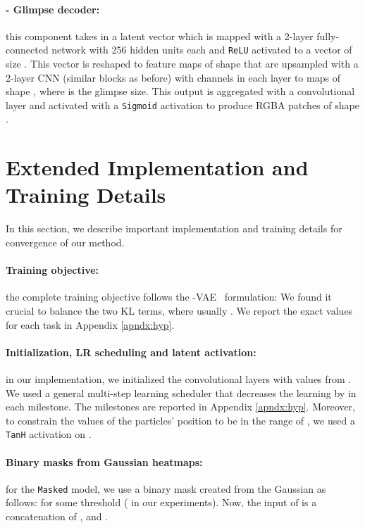 \documentclass[nohyperref]{article}
\theoremstyle{plain}
\theoremstyle{definition}
\theoremstyle{remark}
\begin{document}
\paragraph{ - Glimpse decoder:} this component takes in a latent vector which is mapped with a 2-layer fully-connected network with 256 hidden units each and \texttt{ReLU} activated to a vector of size . This vector is reshaped to feature maps of shape  that are upsampled with a 2-layer CNN (similar blocks as before) with  channels in each layer to maps of shape , where  is the glimpse size. This output is aggregated with a  convolutional layer and activated with a \texttt{Sigmoid} activation to produce RGBA patches of shape .

\section{Extended Implementation and Training Details}
\label{apndx:impl}
In this section, we describe important implementation and training details for convergence of our method.
\paragraph{Training objective:} the complete training objective follows the -VAE~\citep{higgins2017beta} formulation:  We found it crucial to balance the two KL terms, where usually . We report the exact values for each task in Appendix \ref{apndx:hyp}.

\paragraph{Initialization, LR scheduling and latent activation:} in our implementation, we initialized the convolutional layers with values from . We used a general multi-step learning scheduler that decreases the learning by  in each milestone. The milestones are reported in Appendix \ref{apndx:hyp}. Moreover, to constrain the values of the particles' position to be in the range of , we used a \texttt{TanH} activation on .

\paragraph{Binary masks from Gaussian heatmaps:} for the \texttt{Masked} model, we use a binary mask  created from the Gaussian as follows:  for some threshold  ( in our experiments). Now, the input of  is a concatenation of ,  and .
\end{document}
